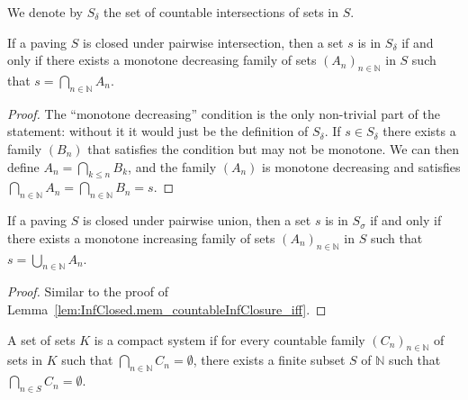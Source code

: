 \begin{definition}\label{def:countableInfClosure}
  \leanok
We denote by $S_\delta$ the set of countable intersections of sets in $S$.
\end{definition}


\begin{lemma}\label{lem:InfClosed.mem_countableInfClosure_iff}
  \leanok
If a paving $S$ is closed under pairwise intersection, then a set $s$ is in $S_\delta$ if and only if there exists a monotone decreasing family of sets $(A_n)_{n\in\mathbb{N}}$ in $S$ such that $s = \bigcap_{n\in\mathbb{N}} A_n$.
\end{lemma}

\begin{proof}\leanok
The ``monotone decreasing'' condition is the only non-trivial part of the statement: without it it would just be the definition of $S_\delta$.
If $s \in S_\delta$ there exists a family $(B_n)$ that satisfies the condition but may not be monotone. We can then define $A_n = \bigcap_{k \le n} B_k$, and the family $(A_n)$ is monotone decreasing and satisfies $\bigcap_{n\in\mathbb{N}} A_n = \bigcap_{n\in\mathbb{N}} B_n = s$.
\end{proof}


\begin{lemma}\label{lem:SupClosed.mem_countableSupClosure_iff}
  \leanok
If a paving $S$ is closed under pairwise union, then a set $s$ is in $S_\sigma$ if and only if there exists a monotone increasing family of sets $(A_n)_{n\in\mathbb{N}}$ in $S$ such that $s = \bigcup_{n\in\mathbb{N}} A_n$.
\end{lemma}

\begin{proof}\leanok
Similar to the proof of Lemma~\ref{lem:InfClosed.mem_countableInfClosure_iff}.
\end{proof}



\begin{definition}\label{def:IsCompactSystem}
  \leanok
A set of sets $K$ is a compact system if for every countable family $(C_n)_{n \in \mathbb{N}}$ of sets in $K$ such that $\bigcap_{n \in\mathbb{N}} C_n = \emptyset$, there exists a finite subset $S$ of $\mathbb{N}$ such that $\bigcap_{n \in S} C_n = \emptyset$.
\end{definition}


